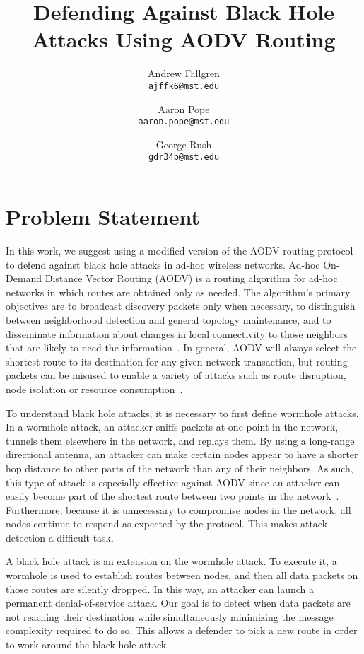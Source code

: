\documentclass[12pt,a4paper]{report}
\author{
    Andrew Fallgren \\
    \texttt{ajffk6@mst.edu}
    \and
    Aaron Pope \\
    \texttt{aaron.pope@mst.edu}
    \and
    George Rush \\
    \texttt{gdr34b@mst.edu}
}
\title{Defending Against Black Hole Attacks Using AODV Routing}
\begin{document}
\maketitle

\tableofcontents

\pagebreak
\section{Problem Statement}
In this work, we suggest using a modified version of the AODV routing protocol to defend against black hole attacks in ad-hoc wireless networks. Ad-hoc On-Demand Distance Vector Routing (AODV) is a routing algorithm for ad-hoc networks in which routes are obtained only as needed. The algorithm's primary objectives are to broadcast discovery packets only when necessary, to distinguish between neighborhood detection and general topology maintenance, and to disseminate information about changes in local connectivity to those neighbors that are likely to need the information~\cite{749281}. In general, AODV will always select the shortest route to its destination for any given network transaction, but routing packets can be misused to enable a variety of attacks such as route disruption, node isolation or resource consumption~\cite{Ning2005795}.

To understand black hole attacks, it is necessary to first define wormhole attacks. In a wormhole attack, an attacker sniffs packets at one point in the network, tunnels them elsewhere in the network, and replays them. By using a long-range directional antenna, an attacker can make certain nodes appear to have a shorter hop distance to other parts of the network than any of their neighbors. As such, this type of attack is especially effective against AODV since an attacker can easily become part of the shortest route between two points in the network~\cite{1589115}. Furthermore, because it is unnecessary to compromise nodes in the network, all nodes continue to respond as expected by the protocol. This makes attack detection a difficult task.

A black hole attack is an extension on the wormhole attack. To execute it, a wormhole is used to establish routes between nodes, and then all data packets on those routes are silently dropped. In this way, an attacker can launch a permanent denial-of-service attack. Our goal is to detect when data packets are not reaching their destination while simultaneously minimizing the message complexity required to do so. This allows a defender to pick a new route in order to work around the black hole attack.
\end{document}

